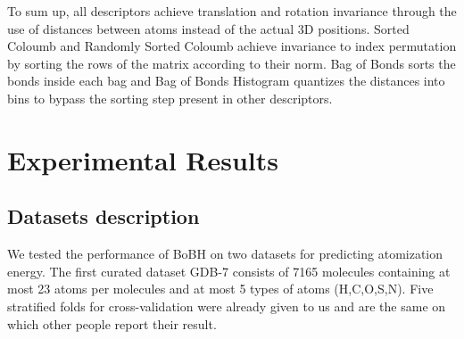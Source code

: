 \documentclass{article}
\begin{document}
To sum up, all descriptors achieve translation and rotation invariance through the use of
distances between atoms instead of the actual 3D positions. Sorted Coloumb and Randomly Sorted Coloumb achieve invariance to index permutation by sorting the rows of the matrix according to their norm. Bag of Bonds sorts the bonds inside each bag and Bag of Bonds Histogram quantizes the distances into bins to bypass the sorting step present in other descriptors.



\section{Experimental Results}

\subsection{Datasets description}
We tested the performance of BoBH on two datasets for predicting atomization energy.
The first curated dataset GDB-7 consists of 7165 molecules containing at most 23 atoms per molecules and at most 5 types of atoms (H,C,O,S,N). Five stratified folds for cross-validation were already given to us and are the same on which other people report their result.
\end{document}
